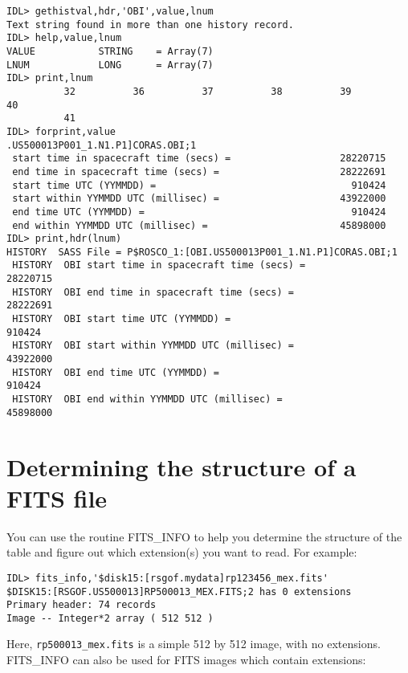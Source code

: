 \medskip\noindent
\begin{verbatim}
IDL> gethistval,hdr,'OBI',value,lnum
Text string found in more than one history record.
IDL> help,value,lnum
VALUE           STRING    = Array(7)
LNUM            LONG      = Array(7)
IDL> print,lnum
          32          36          37          38          39          40
          41
IDL> forprint,value
.US500013P001_1.N1.P1]CORAS.OBI;1
 start time in spacecraft time (secs) =                   28220715
 end time in spacecraft time (secs) =                     28222691
 start time UTC (YYMMDD) =                                  910424
 start within YYMMDD UTC (millisec) =                     43922000
 end time UTC (YYMMDD) =                                    910424
 end within YYMMDD UTC (millisec) =                       45898000
IDL> print,hdr(lnum)
HISTORY  SASS File = P$ROSCO_1:[OBI.US500013P001_1.N1.P1]CORAS.OBI;1
 HISTORY  OBI start time in spacecraft time (secs) =                   28220715
 HISTORY  OBI end time in spacecraft time (secs) =                     28222691
 HISTORY  OBI start time UTC (YYMMDD) =                                  910424
 HISTORY  OBI start within YYMMDD UTC (millisec) =                     43922000
 HISTORY  OBI end time UTC (YYMMDD) =                                    910424
 HISTORY  OBI end within YYMMDD UTC (millisec) =                       45898000
\end{verbatim}
 

\section{Determining the structure of a FITS file}
 
You can use the routine FITS{\_}INFO to help you determine the structure of the
table and figure out which extension(s) you want to read. For example:

\medskip\noindent
\begin{verbatim}
IDL> fits_info,'$disk15:[rsgof.mydata]rp123456_mex.fits'
$DISK15:[RSGOF.US500013]RP500013_MEX.FITS;2 has 0 extensions
Primary header: 74 records
Image -- Integer*2 array ( 512 512 )
\end{verbatim}
Here, {\tt rp500013{\_}mex.fits} is a simple 512 by 512 image, with no extensions.
FITS{\_}INFO can also be used for FITS images which contain extensions:

